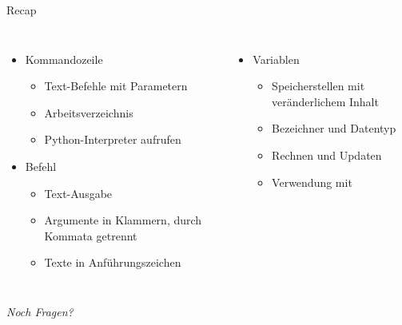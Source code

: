 
\begin{frame}[t,plain]
\titlepage
\end{frame}


\begin{frame}{Recap}
%
\begin{columns}[T]
\begin{itemize}
\item Kommandozeile
	\begin{itemize}
	\item Text-Befehle mit Parametern
	\item Arbeitsverzeichnis
	\item Python-Interpreter aufrufen
	\end{itemize}
\item Befehl 
	\begin{itemize}
	\item Text-Ausgabe
	\item Argumente in Klammern, durch Kommata getrennt
	\item Texte in Anführungszeichen
	\end{itemize}
\end{itemize}
%
\begin{itemize}
\item Variablen
	\begin{itemize}
	\item Speicherstellen mit veränderlichem Inhalt
	\item Bezeichner und Datentyp
	\item Rechnen und Updaten
	\item Verwendung mit 
	\end{itemize}
\end{itemize}
\end{columns}
%
\begin{center}
	\emph{Noch Fragen?}
\end{center}
%
\end{frame}


